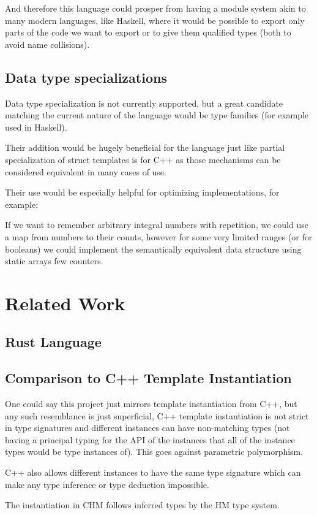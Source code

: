 And therefore this language could prosper from having a module system akin to many modern languages, like Haskell, where it would be possible to export only parts of the code we want to export or to give them qualified types (both to avoid name collisions).

\subsection{Data type specializations}

Data type specialization is not currently supported, but a great candidate matching the current nature of the language would be type families (for example used in Haskell).

Their addition would be hugely beneficial for the language just like partial specialization of struct templates is for C++ as those mechanisms can be considered equivalent in many cases of use.

Their use would be especially helpful for optimizing implementations, for example:

If we want to remember arbitrary integral numbers with repetition, we could use a map from numbers to their counts, however for some very limited ranges (or for booleans) we could implement the semantically equivalent data structure using static arrays few counters.


\section{Related Work}

\subsection{Rust Language}

\subsection{Comparison to C++ Template Instantiation}

One could say this project just mirrors template instantiation from C++, but any such resemblance is just superficial, C++ template instantiation is not strict in type signatures and different instances can have non-matching types (not having a principal typing for the API of the instances that all of the instance types would be type instances of). This goes against parametric polymorphism.

C++ also allows different instances to have the same type signature which can make any type inference or type deduction impossible.

The instantiation in CHM follows inferred types by the HM type system.

